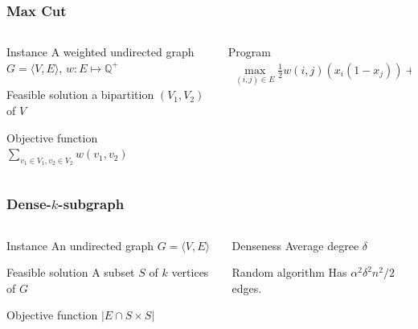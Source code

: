 \documentclass[12pt,aspectratio=169]{beamer}
\begin{document}
\begin{frame}\frametitle{Max Cut }
\begin{columns} 
  \begin{column}{0.48\textwidth}
  \begin{block}{Instance}
    A weighted undirected  graph $G=\langle V,E \rangle$, $w:E\mapsto \mathbb{Q}^{+}$
  \end{block}
  \begin{block}{Feasible solution}
    a bipartition $(V_{1},V_{2})$ of $V$
  \end{block}
  \begin{block}{Objective function}
    $\sum_{v_{1}\in V_{1}, v_{2}\in V_{2}} w(v_{1}, v_{2})$
  \end{block}
\end{column}
\begin{column}{0.48\textwidth}
  \begin{block}{Program}
    \begin{equation}
    \begin{split}
      \max_{(i,j)\in E} \frac{1}{2}w(i,j)\left(x_{i}(1-x_{j})\right) + \left(x_{i}(1-x_{j})\right)%
     \end{split}
   \end{equation}
 \end{block}
\end{column}
\end{columns}
\end{frame}

\begin{frame}\frametitle{Dense-$k$-subgraph }
\begin{columns} 
  \begin{column}{0.48\textwidth}
  \begin{block}{Instance}
    An undirected  graph $G=\langle V,E \rangle$
  \end{block}
  \begin{block}{Feasible solution}
    A subset $S$ of $k$ vertices of $G$
  \end{block}
  \begin{block}{Objective function}
    $|E\cap S\times S|$
  \end{block}
\end{column}
\begin{column}{0.48\textwidth}
  \begin{block}{Denseness}
    Average degree $\delta$%
 \end{block}
  \begin{block}{Random algorithm}
    Has $\alpha^{2} \delta^{2} n^{2}/2$ edges.
%
 \end{block}
\end{column}
\end{columns}
\end{frame}
\end{document}
